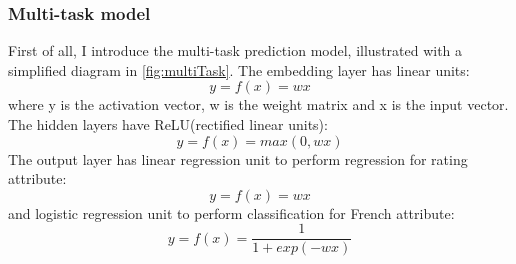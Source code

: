 \documentclass{article}
\begin{document}
\subsubsection{Multi-task model}
First of all, I introduce the multi-task prediction model, illustrated with a simplified diagram in \autoref{fig:multiTask}. The embedding layer has linear units:
\begin{equation}
y = f(x) = w x
\end{equation}
where y is the activation vector, w is the weight matrix and x is the input vector. The hidden layers have ReLU(rectified linear units):
\begin{equation}
y = f(x) = max(0, w x)
\end{equation}
The output layer has linear regression unit to perform regression for rating attribute:
\begin{equation}
	y = f(x) = w x
\end{equation}
and logistic regression unit to perform classification for French attribute:
\begin{equation}
	y = f(x) = \frac{1}{1 + exp(-w x)}
\end{equation}
\end{document}
